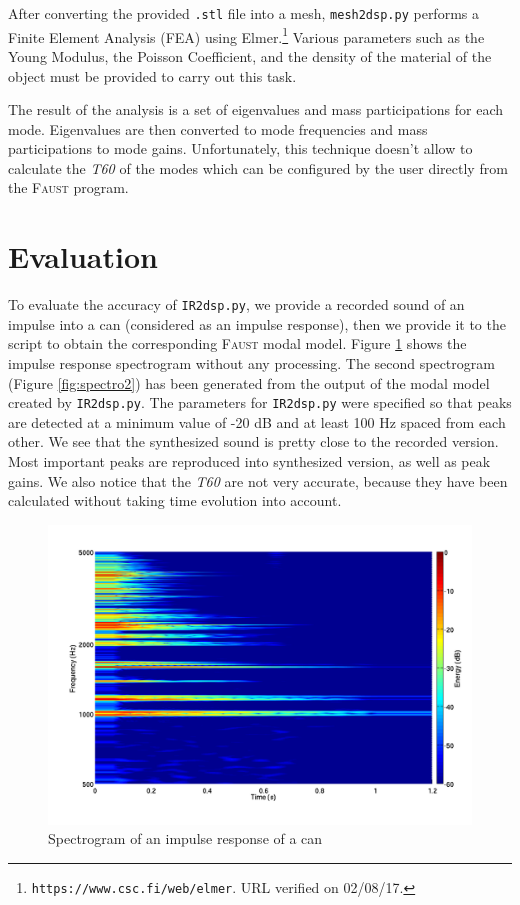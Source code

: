 \documentclass[11pt,a4paper]{article}
\newcommand{\f}{\textsc{Faust}}
\begin{document}
After converting the provided \texttt{.stl} file into a mesh, \texttt{mesh2dsp.py} performs a Finite Element Analysis (FEA) using Elmer.\footnote{\texttt{https://www.csc.fi/web/elmer}. URL verified on 02/08/17.} Various parameters such as the Young Modulus, the Poisson Coefficient, and the density of the material of the object must be provided to carry out this task.

The result of the analysis is a set of eigenvalues and mass participations for each mode. Eigenvalues are then converted to mode frequencies and mass participations to mode gains. Unfortunately, this technique doesn't allow to calculate the \textit{T60} of the modes which can be configured by the user directly from the \f{} program. 

\section{Evaluation}

To evaluate the accuracy of \texttt{IR2dsp.py}, we provide a recorded sound of an impulse into a can (considered as an impulse response), then we provide it to the script to obtain the corresponding \f{} modal model. Figure \ref{fig:spectro1} shows the impulse response spectrogram without any processing. The second spectrogram (Figure \ref{fig:spectro2}) has been generated from the output of the modal model created by \texttt{IR2dsp.py}. The parameters for \texttt{IR2dsp.py} were specified so that peaks are detected at a minimum value of -20 dB and at least 100 Hz spaced from each other. We see that the synthesized sound is pretty close to the recorded version. Most important peaks are reproduced into synthesized version, as well as peak gains. We also notice that the \textit{T60} are not very accurate, because they have been calculated without taking time evolution into account.

\begin{figure}[htbp]
  \centering
  \includegraphics[width=\columnwidth]{pictures/canIR.pdf}
  \caption{Spectrogram of an impulse response of a can}
  \label{fig:spectro1}
\end{figure}
\end{document}
